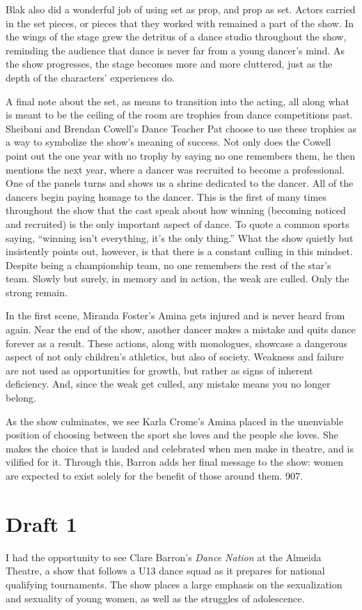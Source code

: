 \documentclass[12pt]{article}[titlepage]
\newcommand{\say}[1]{``#1''}
\newcommand{\1}{\={a}}
\newcommand{\2}{\={e}}
\newcommand{\3}{\={\i}}
\newcommand{\4}{\=o}
\newcommand{\5}{\=u}
\newcommand{\6}{\={A}}
\renewcommand{\,}{\textsuperscript{,}}
\begin{document}
Blak also did a wonderful job of using set as prop, and prop as set.
Actors carried in the set pieces, or pieces that they worked with remained a part of the show.
In the wings of the stage grew the detritus of a dance studio throughout the show, reminding the audience that dance is never far from a young dancer's mind.
As the show progresses, the stage becomes more and more cluttered, just as the depth of the characters' experiences do.

A final note about the set, as means to transition into the acting, all along what is meant to be the ceiling of the room are trophies from dance competitions past.
Sheibani and Brendan Cowell's Dance Teacher Pat choose to use these trophies as a way to symbolize the show's meaning of success.
Not only does the Cowell point out the one year with no trophy by saying no one remembers them, he then mentions the next year, where a dancer was recruited to become a professional.
One of the panels turns and shows us a shrine dedicated to the dancer.
All of the dancers begin paying homage to the dancer.
This is the first of many times throughout the show that the cast speak about how winning (becoming noticed and recruited) is the only important aspect of dance.
To quote a common sports saying, \say{winning isn't everything, it's the only thing.}
What the show quietly but insistently points out, however, is that there is a constant culling in this mindset.
Despite being a championship team, no one remembers the rest of the star's team.
Slowly but surely, in memory and in action, the weak are culled.
Only the strong remain.

In the first scene, Miranda Foster's Amina gets injured and is never heard from again.
Near the end of the show, another dancer makes a mistake and quits dance forever as a result.
These actions, along with monologues, showcase a dangerous aspect of not only children's athletics, but also of society.
Weakness and failure are not used as opportunities for growth, but rather as signs of inherent deficiency.
And, since the weak get culled, any mistake means you no longer belong.

As the show culminates, we see Karla Crome's Amina placed in the unenviable position of choosing between the sport she loves and the people she loves.
She makes the choice that is lauded and celebrated when men make in theatre, and is vilified for it.
Through this, Barron adds her final message to the show: women are expected to exist solely for the benefit of those around them.
907.
\section{Draft 1}
I had the opportunity to see Clare Barron's \textit{Dance Nation} at the Almeida Theatre, a show that follows a U13 dance squad as it prepares for national qualifying tournaments.
The show places a large emphasis on the sexualization and sexuality of young women, as well as the struggles of adolescence.
\end{document}
